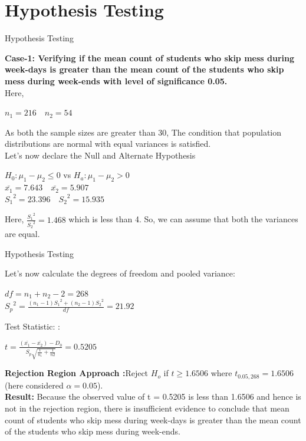 \documentclass{beamer}
\begin{document}
\section{Hypothesis Testing}
\begin{frame}{Hypothesis Testing}
\begin{block}{}
\textbf{Case-1: Verifying if the mean count of students who skip mess during week-days is greater than the mean count of the students who skip mess during week-ends with level of significance 0.05.}\\
Here, \begin{center}
$n_1 = 216 \quad n_2 = 54$\\
\end{center}
As both the sample sizes are greater than 30, The condition that population distributions are normal with equal variances is satisfied.\\
Let's now declare the Null and Alternate Hypothesis\\
\begin{center}
$H_0:\mu_1 - \mu_2 \leq 0$  vs  $H_a:\mu_1 - \mu_2 > 0$\\
$\bar{x_1} = 7.643  \quad \bar{x_2} = 5.907 $\\
${S_1}^2 = 23.396 \quad {S_2}^2 = 15.935$\\
\end{center}
Here, $\frac{{S_1}^2}{{S_2}^2} = 1.468$ which is less than 4. So, we can assume that both the variances are equal.
\end{block}
\end{frame}


\begin{frame}{Hypothesis Testing}
\begin{block}{}
Let's now calculate the degrees of freedom and pooled variance:
\begin{center}
$df = n_1 + n_2 - 2 = 268$\\
${S_p}^2 = \frac{\left(n_1-1\right){S_1}^2 + \left(n_2-1\right){S_2}^2}{df} = 21.92$
\end{center}
Test Statistic: :
\begin{center}
$t = \frac{\left(\bar{x_1}-\bar{x_2}\right) - D_0}{S_p\sqrt{\frac{1}{n_1}+\frac{1}{n2}}} = 0.5205$\\
\end{center}
\textbf{Rejection Region Approach :}Reject $H_o$ if $t \geq 1.6506$ where $t_{0.05,268} = 1.6506$ (here considered $\alpha = 0.05$).\\
\textbf{Result:} Because the observed value of t = 0.5205 is less than 1.6506 and hence is not in the rejection region, there is insufficient evidence to conclude that mean count of students who skip mess during week-days is greater than the mean count of the students who skip mess during week-ends.
\end{block}
\end{frame}
\end{document}
